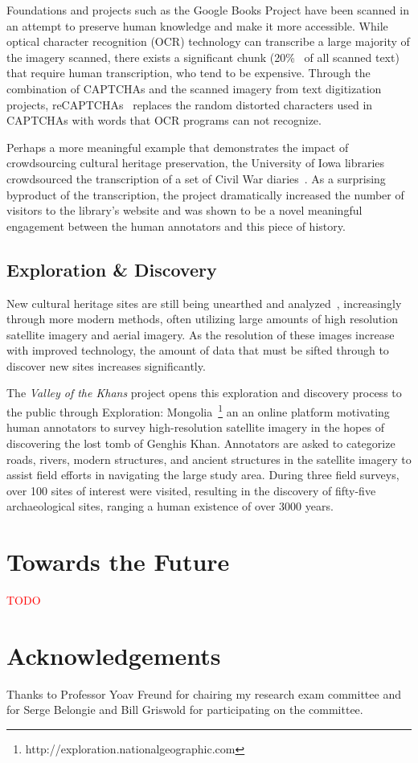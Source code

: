 \documentclass[10pt,twocolumn]{article}
\begin{document}
Foundations and projects such as the Google Books Project have been scanned 
in an attempt to preserve human knowledge and make it more accessible. While
optical character recognition (OCR) technology can transcribe a large majority
of the imagery scanned, there  exists a significant chunk 
(20\%~\cite{VonAhn2008a} of all scanned text) that require human transcription,
who tend to be expensive. Through the combination of CAPTCHAs and the scanned 
imagery from text digitization projects, reCAPTCHAs~\cite{VonAhn2008a} replaces 
the random distorted characters used in CAPTCHAs with words that OCR programs
can not recognize.

Perhaps a more meaningful example that demonstrates the impact of 
crowdsourcing cultural heritage preservation, the University of Iowa 
libraries crowdsourced the transcription of a set of Civil War 
diaries~\cite{Owens2013}. As a surprising byproduct of the transcription, the
project dramatically increased the number of visitors to the library's
website and was shown to be a novel meaningful engagement between the human
annotators and this piece of history.

\subsection{Exploration \& Discovery}

New cultural heritage sites are still being unearthed and 
analyzed~\cite{Lasaponara2007,Rowlands2007,Alexakis2009}, increasingly 
through more modern methods, often utilizing large amounts of
high resolution satellite imagery and aerial imagery. As the resolution of
these images increase with improved technology, the amount of data that must
be sifted through to discover new sites increases significantly.

The \textit{Valley of the Khans} project opens this exploration and discovery
process to the public through Exploration: 
Mongolia~\footnote{http://exploration.nationalgeographic.com} an
an online platform motivating human annotators to survey high-resolution
satellite imagery in the hopes of discovering the lost tomb of Genghis Khan.
Annotators are asked to categorize roads, rivers, modern structures, and
ancient structures in the satellite imagery to assist field efforts in
navigating the large study area. During three field surveys, over 100
sites of interest were visited, resulting in the discovery of fifty-five
archaeological sites, ranging a human existence of over 3000 years.

\section{Towards the Future}
\textcolor{red}{TODO}

\section{Acknowledgements}
Thanks to Professor Yoav Freund for chairing my research exam committee and 
for Serge Belongie and Bill Griswold for participating on the committee.



\end{document}
